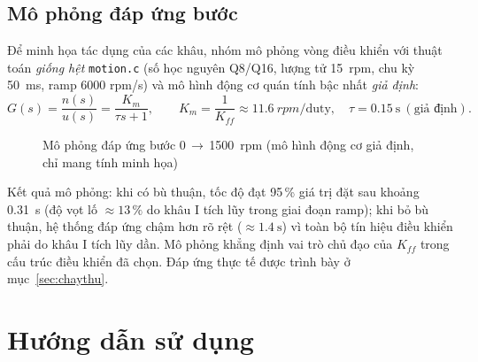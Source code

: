 \subsection{Mô phỏng đáp ứng bước}
Để minh họa tác dụng của các khâu, nhóm mô phỏng vòng điều khiển với thuật toán \emph{giống hệt} \texttt{motion.c} (số học nguyên Q8/Q16, lượng tử \SI{15}{rpm}, chu kỳ \SI{50}{\milli\second}, ramp 6000 rpm/s) và mô hình động cơ quán tính bậc nhất \emph{giả định}:
\begin{equation}
  G(s)=\frac{n(s)}{u(s)}=\frac{K_m}{\tau s+1},\qquad K_m=\frac{1}{K_{ff}}\approx\SI{11.6}{rpm}/\text{duty},\quad \tau=\SI{0.15}{\second}\ (\text{giả định}).
\end{equation}

\begin{figure}[H]
\centering
{}
\caption{Mô phỏng đáp ứng bước 0\,$\to$\,\SI{1500}{rpm} (mô hình động cơ giả định, chỉ mang tính minh họa)}
\label{fig:sim}
\end{figure}

Kết quả mô phỏng: khi có bù thuận, tốc độ đạt 95\,\% giá trị đặt sau khoảng \SI{0.31}{\second} (độ vọt lố $\approx13\,\%$ do khâu I tích lũy trong giai đoạn ramp); khi bỏ bù thuận, hệ thống đáp ứng chậm hơn rõ rệt ($\approx\SI{1.4}{\second}$) vì toàn bộ tín hiệu điều khiển phải do khâu I tích lũy dần. Mô phỏng khẳng định vai trò chủ đạo của $K_{ff}$ trong cấu trúc điều khiển đã chọn. Đáp ứng thực tế được trình bày ở mục~\ref{sec:chaythu}.

\section{Hướng dẫn sử dụng}
\label{sec:huongdan}

